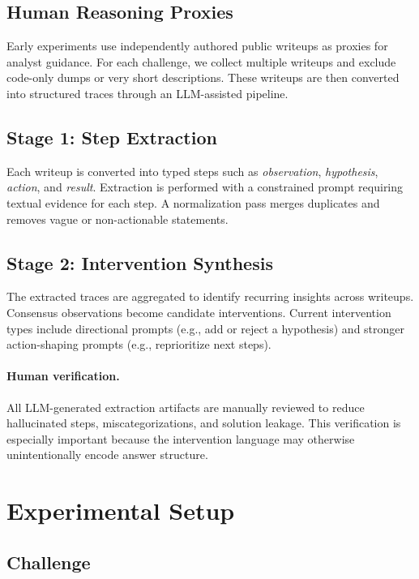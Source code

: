 \documentclass[letterpaper]{article}
\begin{document}
\subsection{Human Reasoning Proxies}

Early experiments use independently authored public writeups as proxies for analyst guidance.
For each challenge, we collect multiple writeups and exclude code-only dumps or very short descriptions.
These writeups are then converted into structured traces through an LLM-assisted pipeline.

\subsection{Stage 1: Step Extraction}

Each writeup is converted into typed steps such as \emph{observation}, \emph{hypothesis}, \emph{action}, and \emph{result}.
Extraction is performed with a constrained prompt requiring textual evidence for each step.
A normalization pass merges duplicates and removes vague or non-actionable statements.

\subsection{Stage 2: Intervention Synthesis}

The extracted traces are aggregated to identify recurring insights across writeups.
Consensus observations become candidate interventions.
Current intervention types include directional prompts (e.g., add or reject a hypothesis) and stronger action-shaping prompts (e.g., reprioritize next steps).

\paragraph{Human verification.}
All LLM-generated extraction artifacts are manually reviewed to reduce hallucinated steps, miscategorizations, and solution leakage.
This verification is especially important because the intervention language may otherwise unintentionally encode answer structure.

\section{Experimental Setup}

\subsection{Challenge}
\end{document}
